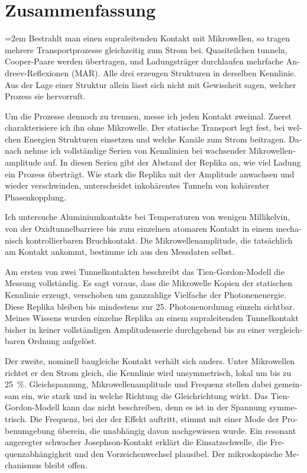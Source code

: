 \clearpage
{}

\section*{Zusammenfassung}
\begin{otherlanguage}{ngerman}
    \emergencystretch=2em
    Bestrahlt man einen supraleitenden Kontakt mit Mikrowellen, so tragen mehrere Transportprozesse gleichzeitig zum Strom bei. Quasiteilchen tunneln, Cooper-Paare werden übertragen, und Ladungsträger durchlaufen mehrfache Andreev-Reflexionen (MAR). Alle drei erzeugen Strukturen in derselben Kennlinie. Aus der Lage einer Struktur allein lässt sich nicht mit Gewissheit sagen, welcher Prozess sie hervorruft.

    Um die Prozesse dennoch zu trennen, messe ich jeden Kontakt zweimal. Zuerst charakterisiere ich ihn ohne Mikrowelle. Der statische Transport legt fest, bei welchen Energien Strukturen einsetzen und welche Kanäle zum Strom beitragen. Danach nehme ich vollständige Serien von Kennlinien bei wachsender Mikrowellenamplitude auf. In diesen Serien gibt der Abstand der Replika an, wie viel Ladung ein Prozess überträgt. Wie stark die Replika mit der Amplitude anwachsen und wieder verschwinden, unterscheidet inkohärentes Tunneln von kohärenter Phasenkopplung.

    Ich untersuche Aluminiumkontakte bei Temperaturen von wenigen Millikelvin, von der Oxidtunnelbarriere bis zum einzelnen atomaren Kontakt in einem mechanisch kontrollierbaren Bruchkontakt. Die Mikrowellenamplitude, die tatsächlich am Kontakt ankommt, bestimme ich aus den Messdaten selbst.

    Am ersten von zwei Tunnelkontakten beschreibt das Tien-Gordon-Modell die Messung vollständig. Es sagt voraus, dass die Mikrowelle Kopien der statischen Kennlinie erzeugt, verschoben um ganzzahlige Vielfache der Photonenenergie. Diese Replika bleiben bis mindestens zur 25. Photonenordnung einzeln sichtbar. Meines Wissens wurden einzelne Replika an einem supraleitenden Tunnelkontakt bisher in keiner vollständigen Amplitudenserie durchgehend bis zu einer vergleichbaren Ordnung aufgelöst.

    Der zweite, nominell baugleiche Kontakt verhält sich anders. Unter Mikrowellen richtet er den Strom gleich, die Kennlinie wird unsymmetrisch, lokal um bis zu \qty{25}{\percent}. Gleichspannung, Mikrowellenamplitude und Frequenz stellen dabei gemeinsam ein, wie stark und in welche Richtung die Gleichrichtung wirkt. Das Tien-Gordon-Modell kann das nicht beschreiben, denn es ist in der Spannung symmetrisch. Die Frequenz, bei der der Effekt auftritt, stimmt mit einer Mode der Probenumgebung überein, die unabhängig davon nachgewiesen wurde. Ein resonant angeregter schwacher Josephson-Kontakt erklärt die Einsatzschwelle, die Frequenzabhängigkeit und den Vorzeichenwechsel plausibel. Der mikroskopische Mechanismus bleibt offen.


\end{otherlanguage}
